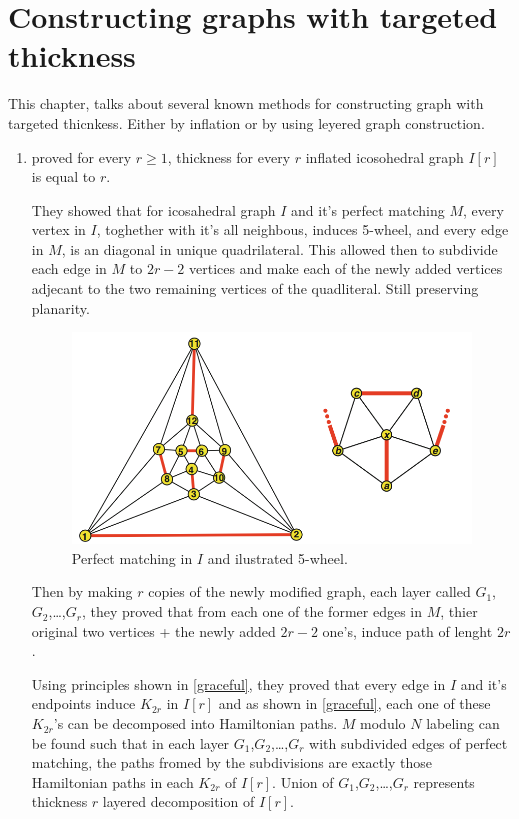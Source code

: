 \section{Constructing graphs with targeted thickness}

This chapter, talks about several known methods for constructing graph with targeted thicnkess. Either by inflation or by using leyered graph construction.

\begin{enumerate}
\item \textcite{ALBERTSON20102725} proved for every $r \geq 1$, thickness for every $r$ inflated icosohedral graph $I[r]$ is equal to $r$.

They showed that for icosahedral graph $I$ and it's perfect matching $M$, every vertex in $I$, toghether with it's all neighbous, induces 5-wheel, and every edge in $M$, is an diagonal in unique quadrilateral. This allowed then to subdivide each edge in $M$ to $2r-2$ vertices and make each of the newly added vertices adjecant to the two remaining vertices of the quadliteral. Still preserving planarity. 

\begin{figure}[H]
\includegraphics[width=\textwidth]{images/icosahedralMatching.PNG}
\caption{Perfect matching in $I$ and ilustrated 5-wheel\parencite{ALBERTSON20102725}.}
\end{figure}

Then by making $r$ copies of the newly modified graph, each layer called $G_1$, $G_2$,\dots,$G_r$, they proved that from each one of the former edges in $M$, thier original two vertices + the newly added $2r-2$ one's, induce path of lenght $2r$.

Using principles shown in \ref{graceful}, they proved that every edge in $I$ and it's endpoints induce $K_{2r}$ in $I[r]$ and as shown in \ref{graceful}, each one of these $K_{2r}$'s can be decomposed into Hamiltonian paths. $M$ modulo $N$ labeling can be found such that in each layer $G_1$,$G_2$,\dots,$G_r$ with subdivided edges of perfect matching, the paths fromed by the subdivisions are exactly those Hamiltonian paths in each $K_{2r}$ of $I[r]$. Union of $G_1$,$G_2$,\dots,$G_r$ represents thickness $r$ layered decomposition of $I[r]$. \parencite{ALBERTSON20102725}


\end{enumerate}
